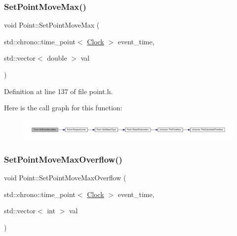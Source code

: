 \subsubsection{\texorpdfstring{Set\+Point\+Move\+Max()}{SetPointMoveMax()}}
{\footnotesize\ttfamily void Point\+::\+Set\+Point\+Move\+Max (\begin{DoxyParamCaption}\item[{std\+::chrono\+::time\+\_\+point$<$ \hyperlink{universe_8h_a0ef8d951d1ca5ab3cfaf7ab4c7a6fd80}{Clock} $>$}]{event\+\_\+time,  }\item[{std\+::vector$<$ double $>$}]{val }\end{DoxyParamCaption})\hspace{0.3cm}{\ttfamily [inline]}}



Definition at line 137 of file point.\+h.

Here is the call graph for this function\+:
\nopagebreak
\begin{figure}[H]
\begin{center}
\leavevmode
\includegraphics[width=350pt]{class_point_afa3c2290a72c99e8892029eaa6676204_cgraph}
\end{center}
\end{figure}
\mbox{\label{class_point_a7c9776ffca2fde856fa8eaee669d9881}} 
\subsubsection{\texorpdfstring{Set\+Point\+Move\+Max\+Overflow()}{SetPointMoveMaxOverflow()}}
{\footnotesize\ttfamily void Point\+::\+Set\+Point\+Move\+Max\+Overflow (\begin{DoxyParamCaption}\item[{std\+::chrono\+::time\+\_\+point$<$ \hyperlink{universe_8h_a0ef8d951d1ca5ab3cfaf7ab4c7a6fd80}{Clock} $>$}]{event\+\_\+time,  }\item[{std\+::vector$<$ int $>$}]{val }\end{DoxyParamCaption})\hspace{0.3cm}{\ttfamily [inline]}}



